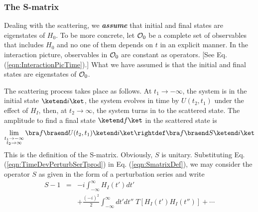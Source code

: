 \subsubsection{The S-matrix}
Dealing with the scattering, we {\bf \textit{assume}} that initial and final states are
eigenstates of $H_0$. To be more concrete, let ${\cal O}_0$ be a complete set of
observables that includes $H_0$ and no one of them depends on $t$ in an explicit manner.
In the interaction picture, observables in ${\cal O}_0$ are constant as operators. [See Eq.
(\ref{eqn:InteractionPicTime}).] What we have assumed is that the initial and final states
are eigenstates of ${\cal O}_0$.

The scattering process takes place as follows. At $t_1 \to -\infty$, the system is in the initial
state $\ketend i \ket$, the system evolves in time by $U(t_2, t_1)$ under the effect of
$H_I$, then, at $t_2 \to \infty$, the system turns in to the scattered state.
The amplitude to find a final state $\ketend f \ket$ in the scattered state is 
\begin{eqnarray}
\lim_{\stackrel{\scriptstyle t_1 \to -\infty}{t_2 \to \infty}}
\bra f \braend U(t_2, t_1) \ketend i \ket
\rightdef
\bra f \braend S \ketend i \ket
\label{eqn:SmatrixDef}
\end{eqnarray}
This is the definition of the S-matrix. Obviously, $S$ is unitary.
Substituting Eq. (\ref{eqn:TimeDevPerturbSerTprod}) 
in Eq. (\ref{eqn:SmatrixDef}), we 
may consider the operator $S$ as given in the form of a perturbation series
and write
\begin{eqnarray}
 S -1 
&=&
 -i \int_{-\infty}^\infty H_I (t') dt'
\nonumber\\
&&+
\frac{(-i)^2}{2}
\int_{-\infty}^\infty dt'
 dt''
\;T[ H_I (t') H_I (t'')]
+ \cdots
\label{eqn:SmatrixPertSer}
\end{eqnarray}